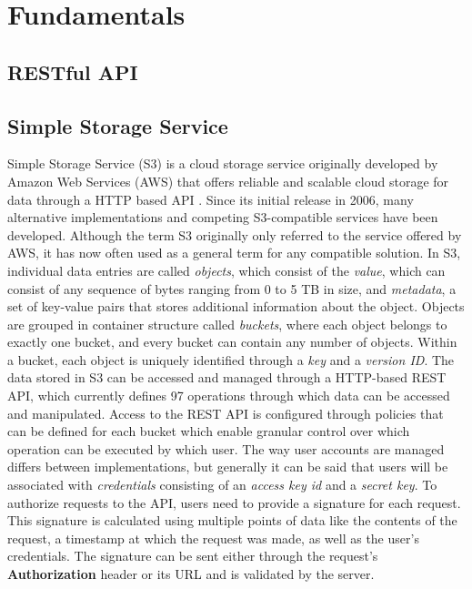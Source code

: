 \chapter{Fundamentals}

\section{RESTful API}

\section{Simple Storage Service}
Simple Storage Service (S3) is a cloud storage service originally developed by Amazon Web Services (AWS) that offers reliable and scalable cloud storage for data through a HTTP based API \cite{AWS_S3_Release} \cite{S3_API}. Since its initial release in 2006, many alternative implementations and competing S3-compatible services have been developed. Although the term S3 originally only referred to the service offered by AWS, it has now often used as a general term for any compatible solution.
In S3, individual data entries are called \textit{objects}, which consist of the \textit{value}, which can consist of any sequence of bytes ranging from 0 to 5 TB in size\cite{AWS_S3_Object}, and \textit{metadata}, a set of key-value pairs that stores additional information about the object. Objects are grouped in container structure called \textit{buckets}, where each object belongs to exactly one bucket, and every bucket can contain any number of objects. Within a bucket, each object is uniquely identified through a \textit{key} and a \textit{version ID}.
The data stored in S3 can be accessed and managed through a HTTP-based REST API, which currently defines 97\cite{S3_API_Actions} operations through which data can be accessed and manipulated.
Access to the REST API is configured through policies that can be defined for each bucket which enable granular control over which operation can be executed by which user. The way user accounts are managed differs between implementations, but generally it can be said that users will be associated with \textit{credentials} consisting of an \textit{access key id} and a \textit{secret key}. To authorize requests to the API, users need to provide a signature for each request. This signature is calculated using multiple points of data like the contents of the request, a timestamp at which the request was made, as well as the user's credentials. The signature can be sent either through the request's \textbf{Authorization} header or its URL and is validated by the server.

